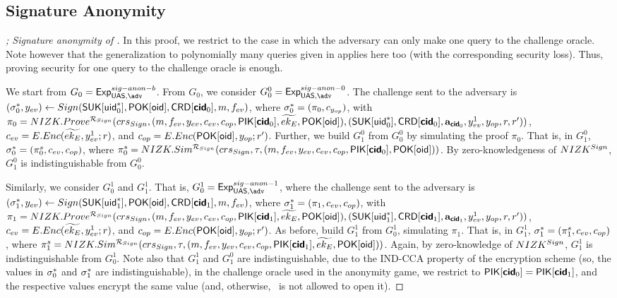 \subsection{Signature Anonymity}

\begin{proof}[; Signature anonymity of \CUASGen]

  In this proof, we restrict to the case in which the adversary can only make
  one query to the challenge oracle. Note however that the generalization to
  polynomially many queries given in \cite{bsz05} applies here too (with the
  corresponding security loss). Thus, proving security for one query to the
  challenge oracle is enough.

  We start from $G_0=\ExpSigAnonb$.  %
  From $G_0$, we consider $G^0_0 = \ExpSigAnonz$. The challenge sent to the
  adversary is $(\mathsf{\sigma}^*_0,y_{ev}) \gets Sign(\mathsf{S}\mathsf{UK}[\mathsf{uid}^*_0],\mathsf{P}\mathsf{OK}[\mathsf{oid}],
  \mathsf{CRD}[\boldsymbol{\mathsf{cid}}_0],m,f_{ev})$, where $\mathsf{\sigma}^*_0 = (\pi_0,c_{y_{op}})$, with
  $\pi_0 = NIZK.Prove^{\mathcal{R}_{Sign}}(crs_{Sign},(m,f_{ev},y_{ev},
  c_{ev},c_{op},\mathsf{P}\mathsf{IK}[\boldsymbol{\mathsf{cid}}_0],\widetilde{ek_{E}},\mathsf{P}\mathsf{OK}[\mathsf{oid}]),(\mathsf{S}\mathsf{UK}[\mathsf{uid}^*_0],
  \mathsf{CRD}[\boldsymbol{\mathsf{cid}}_0],\mathbf{a}_{\boldsymbol{\mathsf{cid}}_0},y_{ev}^1,y_{op},r,r'))$, $c_{ev} = E.Enc
  (\widetilde{ek_{E}},y_{ev}^1;r)$, and $c_{op} = E.Enc(\mathsf{P}\mathsf{OK}[\mathsf{oid}],y_{op};r')$.
  Further, we build $G_1^0$ from $G_0^0$ by simulating the proof $\pi_0$. That
  is, in $G_1^0$, $\mathsf{\sigma}^*_0 = (\pi_0^s,c_{ev},c_{op})$, where $\pi^s_0 =
  NIZK.Sim^{\mathcal{R}_{Sign}}(crs_{Sign},\tau,(m,f_{ev},y_{ev},
  c_{ev},c_{op},\mathsf{P}\mathsf{IK}[\boldsymbol{\mathsf{cid}}_0],\mathsf{P}\mathsf{OK}[\mathsf{oid}]))$. By zero-knowledgeness
  of $NIZK^{Sign}$, $G_1^0$ is indistinguishable from $G_0^0$.

  Similarly, we consider $G_0^1$ and $G_1^1$. That is, $G_0^1 = \ExpSigAnono$,
  where the challenge
  sent to the adversary is $(\mathsf{\sigma}^*_1,y_{ev}) \gets Sign(\mathsf{S}\mathsf{UK}[\mathsf{uid}^*_1],
  \mathsf{P}\mathsf{OK}[\mathsf{oid}],\mathsf{CRD}[\boldsymbol{\mathsf{cid}}_1],m,f_{ev})$, where $\mathsf{\sigma}^*_1 = (\pi_1,c_{ev},
  c_{op})$, with $\pi_1 = NIZK.Prove^{\mathcal{R}_{Sign}}(crs_{Sign},
  (m,f_{ev},y_{ev},c_{ev},c_{op},\mathsf{P}\mathsf{IK}[\boldsymbol{\mathsf{cid}}_1],\widetilde{ek_{E}},
  \mathsf{P}\mathsf{OK}[\mathsf{oid}]),(\mathsf{S}\mathsf{UK}[\mathsf{uid}^*_1],\mathsf{CRD}[\boldsymbol{\mathsf{cid}}_1],\mathbf{a}_{\boldsymbol{\mathsf{cid}}_1},y_{ev}^1,
  y_{op},r,r'))$, $c_{ev} = E.Enc(\widetilde{ek_{E}},y_{ev}^1;r)$, and
  $c_{op} = E.Enc(\mathsf{P}\mathsf{OK}[\mathsf{oid}],y_{op};r')$. As before, build $G_1^1$ from
  $G_0^1$, simulating $\pi_1$. That is, in $G_1^1$, $\mathsf{\sigma}^*_1 = (\pi_1^s,c_{ev},
  c_{op})$, where $\pi^s_1 = NIZK.Sim^{\mathcal{R}_{Sign}}(crs_{Sign},
  \tau,(m,f_{ev},y_{ev},c_{ev},c_{op},\mathsf{P}\mathsf{IK}[\boldsymbol{\mathsf{cid}}_1],\widetilde{ek_{E}},
  \mathsf{P}\mathsf{OK}[\mathsf{oid}]))$. Again, by zero-knowledge of $NIZK^{Sign}$, $G_1^1$ is
  indistinguishable from $G_0^1$. Note also that $G_1^1$ and $G_1^0$ are
  indistinguishable, due to the IND-CCA property of the encryption scheme
  (so, the \ceval values in $\mathsf{\sigma}^*_0$ and $\mathsf{\sigma}^*_1$ are indistinguishable),
  in the  challenge oracle used in the anonymity game, we restrict to
  $\mathsf{P}\mathsf{IK}[\boldsymbol{\mathsf{cid}}_0] = \mathsf{P}\mathsf{IK}[\boldsymbol{\mathsf{cid}}_1]$, and the respective \cinsp values encrypt
  the same \yinsp value (and, otherwise, \adv~is not allowed to open it).


\end{proof}
